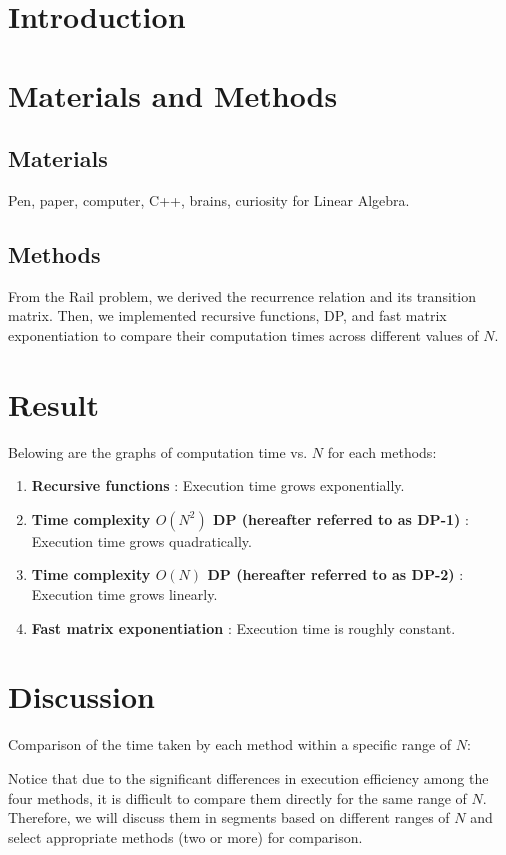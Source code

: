 \section{Introduction}

\section{Materials and Methods}
\subsection{Materials}

Pen, paper, computer, C++, brains, curiosity for Linear Algebra.

\subsection{Methods}

From the Rail problem, we derived the recurrence relation and its transition matrix.
Then, we implemented recursive functions, DP, and fast matrix exponentiation to compare their computation times across different values of $N$.

\section{Result}

Belowing are the graphs of computation time vs. $N$ for each methods:
\begin{enumerate}
    \item \textbf{Recursive functions} : Execution time grows exponentially.
    \item \textbf{Time complexity $O(N^2)$ DP (hereafter referred to as DP-1)} : Execution time grows quadratically.
    \item \textbf{Time complexity $O(N)$ DP (hereafter referred to as DP-2)} : Execution time grows linearly.
    \item \textbf{Fast matrix exponentiation} : Execution time is roughly constant.
\end{enumerate}

\section{Discussion}

Comparison of the time taken by each method within a specific range of $N$:

Notice that due to the significant differences in execution efficiency among the four methods, it is difficult to compare them directly for the same range of $N$. 
Therefore, we will discuss them in segments based on different ranges of $N$ and select appropriate methods (two or more) for comparison.

